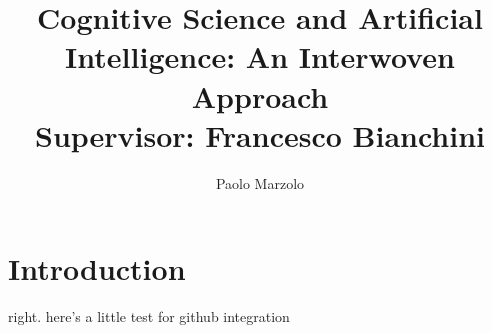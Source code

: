 \documentclass{article}
\title{Cognitive Science and Artificial Intelligence: An Interwoven Approach \\
\large Supervisor: Francesco Bianchini}
\author{Paolo Marzolo}
\begin{document}
\maketitle

\section{Introduction}
right. here's a little test for github integration


\end{document}
